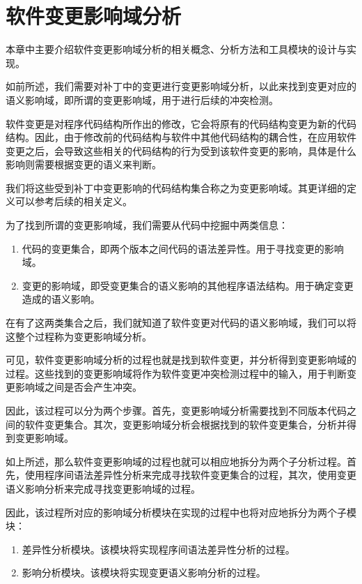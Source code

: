 \chapter{软件变更影响域分析}
\label{chap_impact}

本章中主要介绍软件变更影响域分析的相关概念、分析方法和工具模块的设计与实现。

如前所述，我们需要对补丁中的变更进行变更影响域分析，以此来找到变更对应的语义影响域，即所谓的变更影响域，用于进行后续的冲突检测。

软件变更是对程序代码结构所作出的修改，它会将原有的代码结构变更为新的代码结构。因此，由于修改前的代码结构与软件中其他代码结构的耦合性，在应用软件变更之后，会导致这些相关的代码结构的行为受到该软件变更的影响，具体是什么影响则需要根据变更的语义来判断。

我们将这些受到补丁中变更影响的代码结构集合称之为变更影响域。其更详细的定义可以参考后续的相关定义。


为了找到所谓的变更影响域，我们需要从代码中挖掘中两类信息：
\begin{enumerate}
	\item 代码的变更集合，即两个版本之间代码的语法差异性。用于寻找变更的影响域。
	\item 变更的影响域，即受变更集合的语义影响的其他程序语法结构。用于确定变更造成的语义影响。
\end{enumerate}

在有了这两类集合之后，我们就知道了软件变更对代码的语义影响域，我们可以将这整个过程称为变更影响域分析。

可见，软件变更影响域分析的过程也就是找到软件变更，并分析得到变更影响域的过程。这些找到的变更影响域将作为软件变更冲突检测过程中的输入，用于判断变更影响域之间是否会产生冲突。

因此，该过程可以分为两个步骤。首先，变更影响域分析需要找到不同版本代码之间的软件变更集合。其次，变更影响域分析会根据找到的软件变更集合，分析并得到变更影响域。

如上所述，那么软件变更影响域的过程也就可以相应地拆分为两个子分析过程。首先，使用程序间语法差异性分析来完成寻找软件变更集合的过程，其次，使用变更语义影响分析来完成寻找变更影响域的过程。

因此，该过程所对应的影响域分析模块在实现的过程中也将对应地拆分为两个子模块：
\begin{enumerate}
	\item 差异性分析模块。该模块将实现程序间语法差异性分析的过程。
	\item 影响分析模块。该模块将实现变更语义影响分析的过程。
\end{enumerate}

